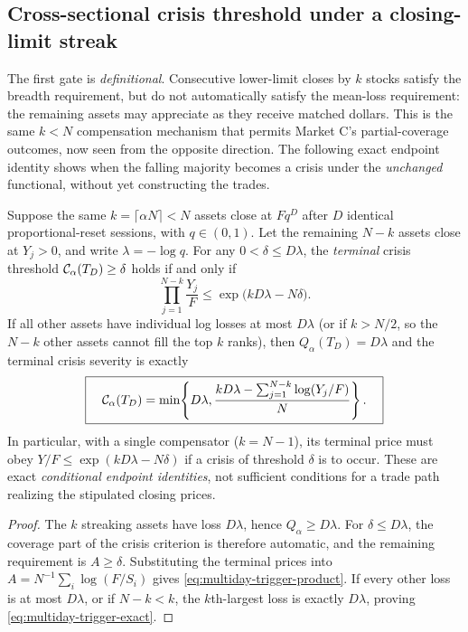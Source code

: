 \documentclass[review,hidelinks,onefignum,onetabnum]{siamonline250211}
\begin{document}
\subsection{Cross-sectional crisis threshold under a closing-limit streak}\label{subsec:multiday-breadth}
The first gate is \emph{definitional}. Consecutive lower-limit closes by $k$ stocks satisfy the breadth requirement, but do not automatically satisfy the mean-loss requirement: the remaining assets may appreciate as they receive matched dollars. This is the same $k<N$ compensation mechanism that permits Market C's partial-coverage outcomes, now seen from the opposite direction. The following exact endpoint identity shows when the falling majority becomes a crisis under the \emph{unchanged} functional, without yet constructing the trades.
\begin{proposition}\label{prop:multiday-crisis-trigger}
Suppose the same $k=\lceil\alpha N\rceil<N$ assets close at $Fq^D$ after $D$ identical proportional-reset sessions, with $q\in(0,1)$. Let the remaining $N-k$ assets close at $Y_j>0$, and write $\lambda=-\log q$. For any $0<\delta\le D\lambda$, the \emph{terminal} crisis threshold $\mathcal{C}_\alpha(T_D)\ge\delta$ holds if and only if
\begin{equation}\label{eq:multiday-trigger-product}
\boxed{\qquad \prod_{j=1}^{N-k}\frac{Y_j}{F}
 \le\exp\bigl(kD\lambda-N\delta\bigr).\qquad}
\end{equation}
If all other assets have individual log losses at most $D\lambda$ (or if $k>N/2$, so the $N-k$ other assets cannot fill the top $k$ ranks), then $Q_\alpha(T_D)=D\lambda$ and the terminal crisis severity is exactly
\begin{equation}\label{eq:multiday-trigger-exact}
\boxed{\quad\mathcal{C}_\alpha(T_D)=\min\!\left\{D\lambda,
 \frac{kD\lambda-\sum_{j=1}^{N-k}\log(Y_j/F)}{N}\right\}.\quad}
\end{equation}
In particular, with a single compensator ($k=N-1$), its terminal price must obey $Y/F\le\exp(kD\lambda-N\delta)$ if a crisis of threshold $\delta$ is to occur. These are exact \emph{conditional endpoint identities}, not sufficient conditions for a trade path realizing the stipulated closing prices.
\end{proposition}
\begin{proof}
The $k$ streaking assets have loss $D\lambda$, hence $Q_\alpha\ge D\lambda$. For $\delta\le D\lambda$, the coverage part of the crisis criterion is therefore automatic, and the remaining requirement is $A\ge\delta$. Substituting the terminal prices into $A=N^{-1}\sum_i\log(F/S_i)$ gives \eqref{eq:multiday-trigger-product}. If every other loss is at most $D\lambda$, or if $N-k<k$, the $k$th-largest loss is exactly $D\lambda$, proving \eqref{eq:multiday-trigger-exact}.
\end{proof}
\end{document}
